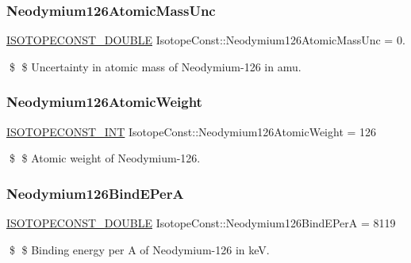 \subsubsection{\texorpdfstring{Neodymium126\+Atomic\+Mass\+Unc}{Neodymium126AtomicMassUnc}}
{\footnotesize\ttfamily \mbox{\hyperlink{group___isotope_const-_macros_ga8f45a7272ce02c0b4c65c44636ed719a}{I\+S\+O\+T\+O\+P\+E\+C\+O\+N\+S\+T\+\_\+\+D\+O\+U\+B\+LE}} Isotope\+Const\+::\+Neodymium126\+Atomic\+Mass\+Unc = 0.}

\$ \$ Uncertainty in atomic mass of Neodymium-\/126 in amu. \mbox{\label{group___isotope_const-_neodymium-_nd126_ga3fc3bfef8c245f539619e3af06483e75}} 
\subsubsection{\texorpdfstring{Neodymium126\+Atomic\+Weight}{Neodymium126AtomicWeight}}
{\footnotesize\ttfamily \mbox{\hyperlink{group___isotope_const-_macros_ga5f18360b3e99483a35c32d789e62621c}{I\+S\+O\+T\+O\+P\+E\+C\+O\+N\+S\+T\+\_\+\+I\+NT}} Isotope\+Const\+::\+Neodymium126\+Atomic\+Weight = 126}

\$ \$ Atomic weight of Neodymium-\/126. \mbox{\label{group___isotope_const-_neodymium-_nd126_ga40af2b5a4910b384486dec9e055e2328}} 
\subsubsection{\texorpdfstring{Neodymium126\+Bind\+E\+PerA}{Neodymium126BindEPerA}}
{\footnotesize\ttfamily \mbox{\hyperlink{group___isotope_const-_macros_ga8f45a7272ce02c0b4c65c44636ed719a}{I\+S\+O\+T\+O\+P\+E\+C\+O\+N\+S\+T\+\_\+\+D\+O\+U\+B\+LE}} Isotope\+Const\+::\+Neodymium126\+Bind\+E\+PerA = 8119}

\$ \$ Binding energy per A of Neodymium-\/126 in keV. \mbox{\label{group___isotope_const-_neodymium-_nd126_ga50dd934c1552deaf977dd3180d246eb3}} 
